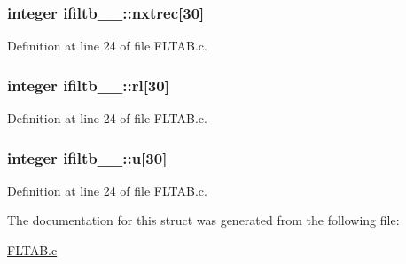 \subsubsection[{\texorpdfstring{nxtrec}{nxtrec}}]{\setlength{\rightskip}{0pt plus 5cm}integer ifiltb\+\_\+\_\+\+::nxtrec\mbox{[}30\mbox{]}}\hypertarget{structifiltb__1___a9d83065c29aa4eb3ae463eebe28994d5}{}\label{structifiltb__1___a9d83065c29aa4eb3ae463eebe28994d5}


Definition at line 24 of file F\+L\+T\+A\+B.\+c.

\subsubsection[{\texorpdfstring{rl}{rl}}]{\setlength{\rightskip}{0pt plus 5cm}integer ifiltb\+\_\+\_\+\+::rl\mbox{[}30\mbox{]}}\hypertarget{structifiltb__1___ae462e1de34e8467619a3a57a1e66ba57}{}\label{structifiltb__1___ae462e1de34e8467619a3a57a1e66ba57}


Definition at line 24 of file F\+L\+T\+A\+B.\+c.

\subsubsection[{\texorpdfstring{u}{u}}]{\setlength{\rightskip}{0pt plus 5cm}integer ifiltb\+\_\+\_\+\+::u\mbox{[}30\mbox{]}}\hypertarget{structifiltb__1___aa2c6cbc5eae74c94b3368a2dfc346ff0}{}\label{structifiltb__1___aa2c6cbc5eae74c94b3368a2dfc346ff0}


Definition at line 24 of file F\+L\+T\+A\+B.\+c.



The documentation for this struct was generated from the following file\+:\begin{DoxyCompactItemize}
\item 
\hyperlink{FLTAB_8c}{F\+L\+T\+A\+B.\+c}\end{DoxyCompactItemize}
